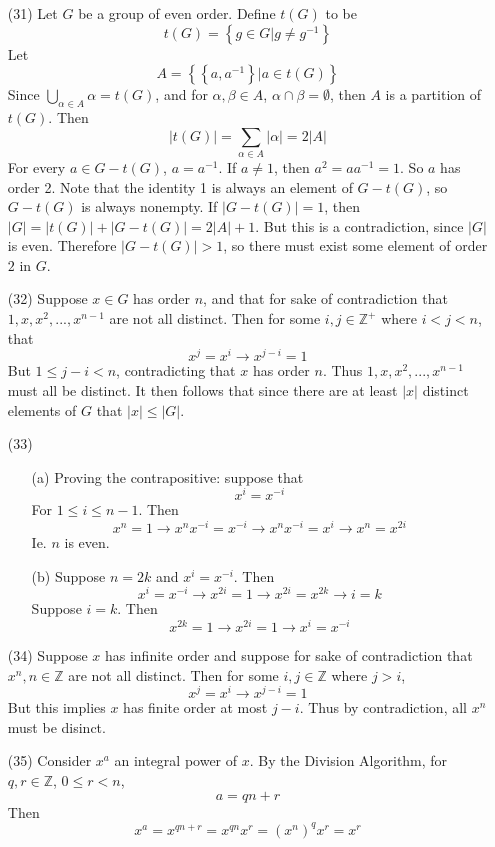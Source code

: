 \documentclass[12pt]{article}
\begin{document}
\begin{itemize}
\item[(31)]
Let $G$ be a group of even order. Define $t(G)$ to be
$$t(G) = \left\lbrace g \in G | g \neq g^{-1} \right\rbrace$$
Let
$$A = \left\lbrace \left\lbrace a, a^{-1} \right\rbrace | a \in t(G) \right\rbrace$$
Since $\bigcup_{\alpha \in A}\alpha = t(G)$, and for $\alpha, \beta \in A$, $\alpha \cap \beta = \emptyset$, then $A$ is a partition of $t(G)$. Then
$$|t(G)| = \sum_{\alpha \in A}|\alpha| = 2|A|$$
For every $a \in G - t(G)$, $a = a^{-1}$. If $a \neq 1$, then $a^2 = aa^{-1} = 1$. So $a$ has order 2. Note that the identity 1 is always an element of $G - t(G)$, so $G - t(G)$ is always nonempty. If $|G - t(G)| = 1$, then $|G| = |t(G)| + |G - t(G)| = 2|A| + 1$. But this is a contradiction, since $|G|$ is even. Therefore $|G - t(G)| > 1$, so there must exist some element of order $2$ in $G$.
\item[(32)]
Suppose $x \in G$ has order $n$, and that for sake of contradiction that $1, x, x^2, ..., x^{n-1}$ are not all distinct. Then for some $i,j \in \mathbb{Z}^+$ where $i < j < n$, that
$$x^j = x^i \rightarrow x^{j - i} = 1$$
But $1 \leq j - i < n$, contradicting that $x$ has order $n$. Thus $1, x, x^2, ..., x^{n-1}$ must all be distinct. It then follows that since there are at least $|x|$ distinct elements of $G$ that $|x| \leq |G|$.
\item[(33)]
\begin{itemize}
\item[(a)]
Proving the contrapositive: suppose that
$$x^i = x^{-i}$$
For $1 \leq i \leq n - 1$. Then
$$x^n = 1 \rightarrow x^nx^{-i} = x^{-i} \rightarrow x^nx^{-i} = x^i \rightarrow x^n = x^{2i}$$
Ie. $n$ is even. 
\item[(b)]
Suppose $n = 2k$ and $x^i = x^{-i}$. Then
$$x^i = x^{-i} \rightarrow x^{2i} = 1 \rightarrow x^{2i} = x^{2k} \rightarrow i = k$$
Suppose $i = k$. Then
$$x^{2k} = 1\rightarrow x^{2i} = 1 \rightarrow x^i = x^{-i}$$
\end{itemize}
\item[(34)]
Suppose $x$ has infinite order and suppose for sake of contradiction that $x^n, n \in \mathbb{Z}$ are not all distinct. Then for some $i, j \in \mathbb{Z}$ where $j > i$, 
$$x^j = x^i \rightarrow x^{j - i} = 1$$
But this implies $x$ has finite order at most $j - i$. Thus by contradiction, all $x^n$ must be disinct.
\item[(35)]
Consider $x^a$ an integral power of $x$. By the Division Algorithm, for $q, r \in \mathbb{Z}$, $0 \leq r < n$,
$$a = qn + r$$
Then
$$x^a = x^{qn + r} = x^{qn}x^r = (x^n)^qx^r = x^r$$

\end{itemize}
\end{document}
